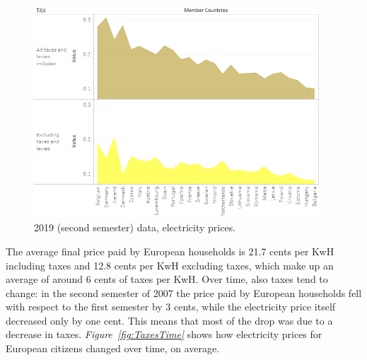 \documentclass[a4paper,12pt]{book}
\begin{document}
\begin{figure}[hbt]
\begin{center}
\captionsetup{justification=centering}
\includegraphics[width=0.95\textwidth]{Images/Taxes.png}
\caption{2019 (second semester) data, electricity prices. }
\label{fig:2019}
\end{center}
\end{figure}


The average final price paid by European households is 21.7 cents per KwH including taxes and 12.8 cents per KwH excluding taxes, which make up an average of around 6 cents of taxes per KwH. Over time, also taxes tend to change: in the second semester of 2007 the price paid by European households fell with respect to the first semester by 3 cents, while the electricity price itself decreased only by one cent. This means that most of the drop was due to a decrease in taxes. \textit{Figure~\ref{fig:TaxesTime}} shows how electricity prices for European citizens changed over time, on average.
\end{document}
